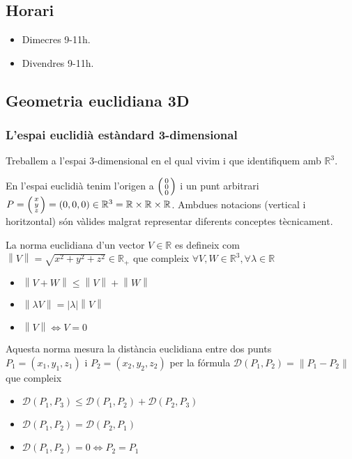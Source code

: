 \documentclass[../main.tex]{subfiles}
\begin{document}
\subsection*{Horari}
\begin{itemize}
    \item Dimecres 9-11h.
    \item Divendres 9-11h.
\end{itemize}
\subsection{Geometria euclidiana 3D}
\subsubsection{L'espai euclidià estàndard 3-dimensional}
Treballem a l'espai 3-dimensional en el qual vivim i que identifiquem amb $\mathbb{R}^3$.
\begin{notacio}
    En l'espai euclidià tenim l'origen a $\begin{psmallmatrix}0\\0\\0\end{psmallmatrix}$ i un punt
    arbitrari $P = \begin{psmallmatrix}x\\y\\z\end{psmallmatrix} = \left(0,0,0\right) \in \mathbb{R}^3 = \mathbb{R} \times \mathbb{R} \times \mathbb{R}$. 
    Ambdues notacions (vertical i horitzontal) són vàlides malgrat representar diferents conceptes
    tècnicament.
\end{notacio}
\begin{definicio}
    La norma euclidiana d'un vector $V \in \mathbb{R}$ es defineix com $\left\lVert V\right\rVert = \sqrt{x^2+y^2+z^2} \in \mathbb{R}_+$
    que compleix $\forall V, W \in \mathbb{R}^3, \forall \lambda \in \mathbb{R}$
    \begin{itemize}
        \item $\left\lVert V+W\right\rVert \leq \left\lVert V\right\rVert + \left\lVert W\right\rVert$
        \item $\left\lVert \lambda V\right\rVert = \left\lvert \lambda\right\rvert\left\lVert V\right\rVert$
        \item $\left\lVert V\right\rVert\iff V = 0$
    \end{itemize}
    Aquesta norma mesura la distància euclidiana entre dos punts $P_1 = (x_1, y_1, z_1)\text{ i }P_2 = (x_2, y_2, z_2)$ 
    per la fórmula 
    $\mathcal{D}\left(P_1, P_2\right) = \left\lVert P_1 - P_2\right\rVert$ que compleix
    \begin{itemize}
        \item $\mathcal{D}\left(P_1, P_3\right) \leq \mathcal{D}\left(P_1, P_2\right) + \mathcal{D}\left(P_2, P_3\right)$
        \item $\mathcal{D}\left(P_1, P_2\right) = \mathcal{D}\left(P_2, P_1\right)$
        \item $\mathcal{D}\left(P_1, P_2\right) = 0 \iff P_2 = P_1$
    \end{itemize}
\end{definicio}
\end{document}
